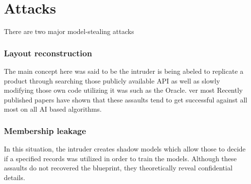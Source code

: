 \documentclass[journal,twoside,web]{ieeecolor}
\begin{document}
\section{Attacks}
There are two major model-stealing attacks
\subsubsection{Layout reconstruction}
The main concept here was said to be the intruder is being abeled to replicate a product through searching those publicly available API as well as slowly modifying those own code utilizing it was such as the Oracle. ver most Recently published papers have shown that these assaults tend to get successful against all most on all AI based algorithms.
\subsubsection{Membership leakage}
In this situation, the intruder creates shadow models which allow those to decide if a specified records was utilized in order to train the models. Although these assaults do not recovered the blueprint, they theoretically reveal confidential details.
\end{document}
